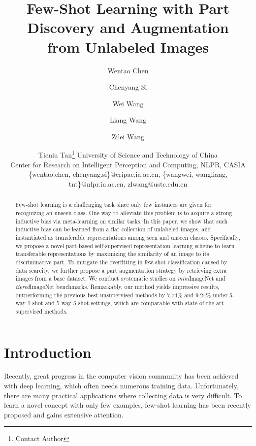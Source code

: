 \documentclass{article}
\title{Few-Shot Learning with Part Discovery and Augmentation \\ from Unlabeled Images}
\author{
Wentao Chen\and
Chenyang Si\and
Wei Wang\and
Liang Wang\and
Zilei Wang\and
Tieniu Tan\footnote{Contact Author}
\affiliations
University of Science and Technology of China\\
Center for Research on Intelligent Perception and Computing, NLPR, CASIA\\
\emails
\{wentao.chen, chenyang.si\}@cripac.ia.ac.cn,
\{wangwei, wangliang, tnt\}@nlpr.ia.ac.cn,
zlwang@ustc.edu.cn
}
\begin{document}
\maketitle

\begin{abstract}




  Few-shot learning is a challenging task since only few instances are given for recognizing an unseen class. One way to alleviate this problem is to acquire a strong inductive bias via meta-learning on similar tasks. In this paper, we show that such inductive bias can be learned from a flat collection of unlabeled images, and instantiated as transferable representations among seen and unseen classes.   Specifically, we propose a novel part-based self-supervised representation learning scheme to learn transferable representations by maximizing the similarity of an image to its discriminative part. 
  To mitigate the overfitting in few-shot classification caused by data scarcity, we further propose a part augmentation strategy by retrieving extra images from a base dataset.
  We conduct systematic studies on \emph{mini}ImageNet and \emph{tiered}ImageNet benchmarks. Remarkably, our method yields impressive results, outperforming the previous best unsupervised methods by 7.74\% and 9.24\% under 5-way 1-shot and 5-way 5-shot settings, which are comparable with state-of-the-art supervised methods.
  




\end{abstract}

\section{Introduction}



Recently, great progress in the computer vision community has been achieved with deep learning, which often needs numerous training data. Unfortunately, there are many practical applications where collecting data is very difficult. To learn a novel concept with only few examples, few-shot learning has been recently proposed and gains extensive attention.\cite{Doersch2020CrossTransformersSF,Afrasiyabi2020AssociativeAF}
\end{document}
